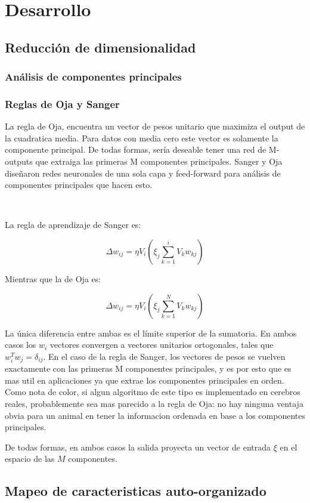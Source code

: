 \documentclass[informe.tex]{subfiles}
\begin{document}
  
  \section{Desarrollo}
    \subsection{Reducción de dimensionalidad}
      \subsubsection{Análisis de componentes principales}
      \subsubsection{Reglas de Oja y Sanger}
	La regla de Oja, encuentra un vector de pesos unitario que maximiza el output de la cuadratica media. Para datos con media cero este vector es solamente la componente principal. De todas formas, sería deseable tener una red de M-outputs que extraiga las primeras M componentes principales. Sanger y Oja diseñaron redes neuronales de una sola capa y feed-forward para análisis de componentes principales que hacen esto.
	
	~
	
	La regla de aprendizaje de Sanger es:

	$$\Delta w_{ij} = \eta V_i(\xi_j \sum_{k=1}^{i} V_k w_{kj} )$$

	Mientras que la de Oja es:

	$$\Delta w_{ij} = \eta V_i(\xi_j \sum_{k=1}^{N} V_k w_{kj} )$$

	La única diferencia entre ambas es el límite superior de la sumatoria. En ambos casos los $w_i$ vectores convergen a vectores unitarios ortogonales, tales que $w^{T}_i w_j = \delta_{ij}$. En el caso de la regla de Sanger, los vectores de pesos se vuelven exactamente con las primeras M componentes principales, y es por esto que es mas util en aplicaciones ya que extrae los componentes principales en orden. Como nota de color, si algun algoritmo de este tipo es implementado en cerebros reales, probablemente sea mas parecido a la regla de Oja: no hay ninguna ventaja obvia para un animal en tener la informacion ordenada en base a los componentes principales. 

	De todas formas, en ambos casos la salida proyecta un vector de entrada $\xi$ en el espacio de las $M$ componentes.
    \subsection{Mapeo de caracteristicas auto-organizado}
  
\end{document}
